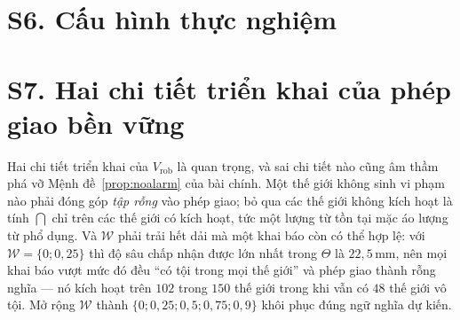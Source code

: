 \begin{minipage}{\textwidth}\footnotesize
{}

\end{minipage}





\begin{table}[!ht]
\centering\footnotesize
\caption{Chi phí MRV mỗi héc-ta mỗi vụ cho bốn kiến trúc. Giám sát chiếm phần lớn chi phí
MRV, nên kiến trúc tránh được cảm biến chuyên dụng thắng ở phần nhân công chứ không phải
ở phần cứng.}\label{tab:baseline}

\end{table}
\FloatBarrier

\section*{S6. Cấu hình thực nghiệm}

\begin{minipage}{\textwidth}\footnotesize
{}\label{tab:setup}

\end{minipage}

\section*{S7. Hai chi tiết triển khai của phép giao bền vững}

Hai chi tiết triển khai của $V_{\mathrm{rob}}$ là quan trọng, và sai chi tiết nào cũng âm
thầm phá vỡ Mệnh đề~\ref{prop:noalarm} của bài chính. Một thế giới không sinh vi phạm nào
phải đóng góp \emph{tập rỗng} vào phép giao; bỏ qua các thế giới không kích hoạt là tính
$\bigcap$ chỉ trên các thế giới có kích hoạt, tức một lượng từ tồn tại mặc áo lượng từ phổ
dụng. Và $\mathcal{W}$ phải trải hết dải mà một khai báo còn có thể hợp lệ: với
$\mathcal{W}=\{0;0{,}25\}$ thì độ sâu chấp nhận được lớn nhất trong $\Theta$ là
$22{,}5$\,mm, nên mọi khai báo vượt mức đó đều ``có tội trong mọi thế giới'' và phép giao
thành rỗng nghĩa --- nó kích hoạt trên $102$ trong $150$ thế giới trong khi vẫn có $48$ thế
giới vô tội. Mở rộng $\mathcal{W}$ thành $\{0;0{,}25;0{,}5;0{,}75;0{,}9\}$ khôi phục đúng
ngữ nghĩa dự kiến.

